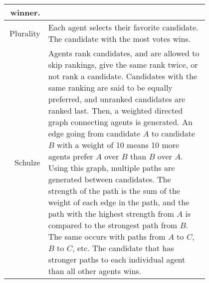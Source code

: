 \begin{tabular}{| r | p{0.80\linewidth} |}
{        winner.
    } \\
    \hline
    Plurality & {
        Each agent selects their favorite candidate.
        The candidate with the most votes wins.
    } \\
    \hline
    Schulze & {
        Agents rank candidates, and are allowed to skip rankings, give the same rank
        twice, or not rank a candidate.
        Candidates with the same ranking are said to be equally preferred, and
        unranked candidates are ranked last.
        Then, a weighted directed graph connecting agents is generated.
        An edge going from candidate $A$ to candidate $B$ with a weight of 10 means
        10 more agents prefer $A$ over $B$ than $B$ over $A$.
        Using this graph, multiple paths are generated between candidates.
        The strength of the path is the sum of the weight of each edge in the path,
        and the path with the highest strength from $A$ is compared to the strongest
        path from $B$.
        The same occurs with paths from $A$ to $C$, $B$ to $C$, etc.
        The candidate that has stronger paths to each individual agent than all other
        agents wins.
    } \\
    \hline
\end{tabular}
